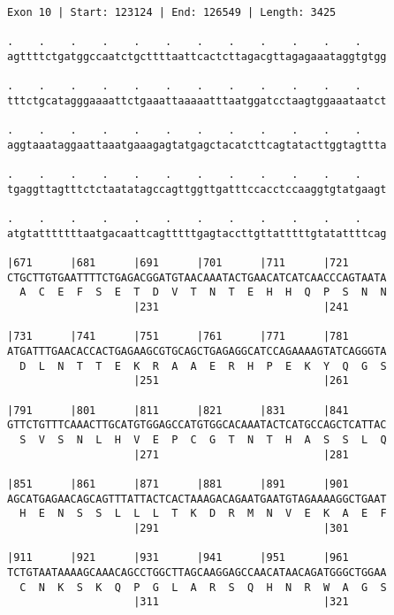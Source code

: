 \documentclass{article}
\begin{document}
\begin{Verbatim}[fontfamily=courier]
Exon 10 | Start: 123124 | End: 126549 | Length: 3425

.    .    .    .    .    .    .    .    .    .    .    .    
agttttctgatggccaatctgcttttaattcactcttagacgttagagaaataggtgtgg

.    .    .    .    .    .    .    .    .    .    .    .    
tttctgcatagggaaaattctgaaattaaaaatttaatggatcctaagtggaaataatct

.    .    .    .    .    .    .    .    .    .    .    .    
aggtaaataggaattaaatgaaagagtatgagctacatcttcagtatacttggtagttta

.    .    .    .    .    .    .    .    .    .    .    .    
tgaggttagtttctctaatatagccagttggttgatttccacctccaaggtgtatgaagt

.    .    .    .    .    .    .    .    .    .    .    .    
atgtatttttttaatgacaattcagtttttgagtaccttgttatttttgtatattttcag

|671      |681      |691      |701      |711      |721      
CTGCTTGTGAATTTTCTGAGACGGATGTAACAAATACTGAACATCATCAACCCAGTAATA
  A  C  E  F  S  E  T  D  V  T  N  T  E  H  H  Q  P  S  N  N
                    |231                          |241      

|731      |741      |751      |761      |771      |781      
ATGATTTGAACACCACTGAGAAGCGTGCAGCTGAGAGGCATCCAGAAAAGTATCAGGGTA
  D  L  N  T  T  E  K  R  A  A  E  R  H  P  E  K  Y  Q  G  S
                    |251                          |261      

|791      |801      |811      |821      |831      |841      
GTTCTGTTTCAAACTTGCATGTGGAGCCATGTGGCACAAATACTCATGCCAGCTCATTAC
  S  V  S  N  L  H  V  E  P  C  G  T  N  T  H  A  S  S  L  Q
                    |271                          |281      

|851      |861      |871      |881      |891      |901      
AGCATGAGAACAGCAGTTTATTACTCACTAAAGACAGAATGAATGTAGAAAAGGCTGAAT
  H  E  N  S  S  L  L  L  T  K  D  R  M  N  V  E  K  A  E  F
                    |291                          |301      

|911      |921      |931      |941      |951      |961      
TCTGTAATAAAAGCAAACAGCCTGGCTTAGCAAGGAGCCAACATAACAGATGGGCTGGAA
  C  N  K  S  K  Q  P  G  L  A  R  S  Q  H  N  R  W  A  G  S
                    |311                          |321      

\end{Verbatim}
\newpage
\end{document}
